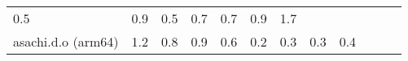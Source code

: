 \documentclass[parskip=half]{scrartcl}
\begin{document}
\begin{table}[h]
\begin{tabular}{@{}llllllllllll@{}}
\begin{minipage}[t]{0.05\columnwidth}
0.5\strut
\end{minipage} & \begin{minipage}[t]{0.05\columnwidth}\raggedright\strut
0.9\strut
\end{minipage} & \begin{minipage}[t]{0.05\columnwidth}\raggedright\strut
0.5\strut
\end{minipage} & \begin{minipage}[t]{0.05\columnwidth}\raggedright\strut
0.7\strut
\end{minipage} & \begin{minipage}[t]{0.05\columnwidth}\raggedright\strut
0.7\strut
\end{minipage} & \begin{minipage}[t]{0.05\columnwidth}\raggedright\strut
0.9\strut
\end{minipage} & \begin{minipage}[t]{0.05\columnwidth}\raggedright\strut
1.7\strut
\end{minipage}\tabularnewline
\begin{minipage}[t]{0.12\columnwidth}\raggedright\strut
asachi.d.o (arm64)\strut
\end{minipage} & \begin{minipage}[t]{0.05\columnwidth}\raggedright\strut
1.2\strut
\end{minipage} & \begin{minipage}[t]{0.05\columnwidth}\raggedright\strut
0.8\strut
\end{minipage} & \begin{minipage}[t]{0.05\columnwidth}\raggedright\strut
0.9\strut
\end{minipage} & \begin{minipage}[t]{0.05\columnwidth}\raggedright\strut
0.6\strut
\end{minipage} & \begin{minipage}[t]{0.05\columnwidth}\raggedright\strut
0.2\strut
\end{minipage} & \begin{minipage}[t]{0.05\columnwidth}\raggedright\strut
0.3\strut
\end{minipage} & \begin{minipage}[t]{0.05\columnwidth}\raggedright\strut
0.3\strut
\end{minipage} & \begin{minipage}[t]{0.05\columnwidth}\raggedright\strut
0.4\strut
\end{minipage} & \begin{minipage}[t]{0.05\columnwidth}\raggedright\strut

\end{minipage}
\end{tabular}
\end{table}
\end{document}
